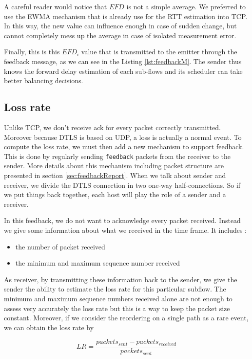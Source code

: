 A careful reader would notice that $EFD$ is not a simple average. We preferred to use the EWMA mechanism that is already use for the RTT estimation into TCP. In this way, the new value can influence enough in case of sudden change, but cannot completely mess up the average in case of isolated measurement error.

Finally, this is this $EFD_{i}$ value that is transmitted to the emitter through the feedback message, as we can see in the Listing \ref{lst:feedbackM}. The sender thus knows the forward delay estimation of each sub-flows and its scheduler can take better balancing decisions.

\subsection{Loss rate}
\label{sec:design-loss-rate}

Unlike TCP, we don't receive ack for every packet correctly transmitted. Moreover because DTLS is based on UDP, a loss is actually a normal event. To compute the loss rate, we must then add a new mechanism to support feedback. This is done by regularly sending \texttt{feedback} packets from the receiver to the sender. More details about this mechanism including packet structure are presented in section \ref{sec:feedbackReport}. When we talk about sender and receiver, we divide the DTLS connection in two one-way half-connections. So if we put things back together, each host will play the role of a sender and a receiver.

In this feedback, we do not want to acknowledge every packet received. Instead we give some information about what we received in the time frame. It includes : 

\begin{itemize}
\item the number of packet received
\item the minimum and maximum sequence number received
\end{itemize}

As receiver, by transmitting these information back to the sender, we give the sender the ability to estimate the loss rate for this particular subflow. The minimum and maximum sequence numbers received alone are not enough to assess very accurately the loss rate but this is a way to keep the packet size constant. Moreover, if we consider the reordering on a single path as a rare event, we can obtain the loss rate by 

\begin{equation*}
LR = \frac{packets_{sent} - packets_{received}}{packets_{sent}}
\end{equation*}

